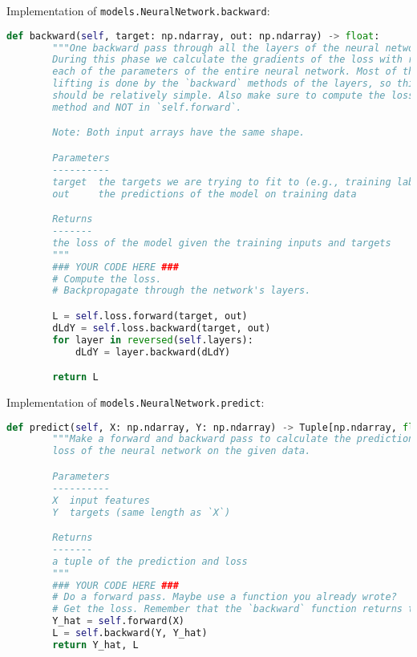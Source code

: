 Implementation of \texttt{models.NeuralNetwork.backward}:

\begin{lstlisting}[language=Python]
    def backward(self, target: np.ndarray, out: np.ndarray) -> float:
        """One backward pass through all the layers of the neural network.
        During this phase we calculate the gradients of the loss with respect to
        each of the parameters of the entire neural network. Most of the heavy
        lifting is done by the `backward` methods of the layers, so this method
        should be relatively simple. Also make sure to compute the loss in this
        method and NOT in `self.forward`.

        Note: Both input arrays have the same shape.

        Parameters
        ----------
        target  the targets we are trying to fit to (e.g., training labels)
        out     the predictions of the model on training data

        Returns
        -------
        the loss of the model given the training inputs and targets
        """
        ### YOUR CODE HERE ###
        # Compute the loss.
        # Backpropagate through the network's layers.

        L = self.loss.forward(target, out)
        dLdY = self.loss.backward(target, out)
        for layer in reversed(self.layers):
            dLdY = layer.backward(dLdY)

        return L 

\end{lstlisting}

Implementation of \texttt{models.NeuralNetwork.predict}:

\begin{lstlisting}[language=Python]
    def predict(self, X: np.ndarray, Y: np.ndarray) -> Tuple[np.ndarray, float]:
        """Make a forward and backward pass to calculate the predictions and
        loss of the neural network on the given data.

        Parameters
        ----------
        X  input features
        Y  targets (same length as `X`)

        Returns
        -------
        a tuple of the prediction and loss
        """
        ### YOUR CODE HERE ###
        # Do a forward pass. Maybe use a function you already wrote?
        # Get the loss. Remember that the `backward` function returns the loss.
        Y_hat = self.forward(X)
        L = self.backward(Y, Y_hat)
        return Y_hat, L

\end{lstlisting}

